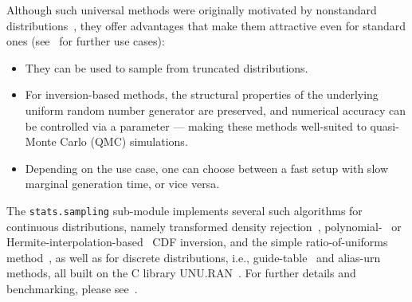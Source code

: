 \documentclass[acmsmall]{acmart}
\begin{document}
Although such universal methods were originally motivated by nonstandard
distributions~\cite{hormann2004}, they offer advantages that make them attractive
even for standard ones (see~\cite{derflinger2010} for further use cases):
\begin{itemize}
\item They can be used to sample from truncated distributions.
\item For inversion-based methods, the structural properties of the
underlying uniform random number generator are preserved, and numerical
accuracy can be controlled via a parameter --- making these methods
well-suited to quasi-Monte Carlo (QMC) simulations.
\item Depending on the use case, one can choose between a fast setup with
slow marginal generation time, or vice versa.
\end{itemize}

The \texttt{stats.sampling} sub-module implements several such algorithms for
continuous distributions, namely transformed density
rejection~\cite{hormann1995, gilks1992}, polynomial-~\cite{derflinger2010} or
Hermite-interpolation-based~\cite{hormann2003} CDF inversion, and the simple
ratio-of-uniforms method~\cite{leydold2001, leydold2003}, as well as for
discrete distributions, i.e., guide-table~\cite{chen1974} and
alias-urn~\cite{walker1977} methods, all built on the C library UNU.RAN~\cite{hormann2007}.
For further details and benchmarking, please see~\cite{baumgarten2022}.
\end{document}
